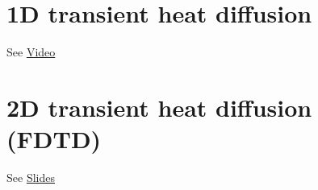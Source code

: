 \documentclass{article}
\begin{document}
\section*{1D transient heat diffusion}

See \href{https://www.youtube.com/watch?v=CDSM5bLy8lU}{Video}

\section{2D transient heat diffusion (FDTD)}

See \href{https://sites.ualberta.ca/dept/chemeng/courses/che374/F07/notes/pdes.pdf}{Slides}
\end{document}
